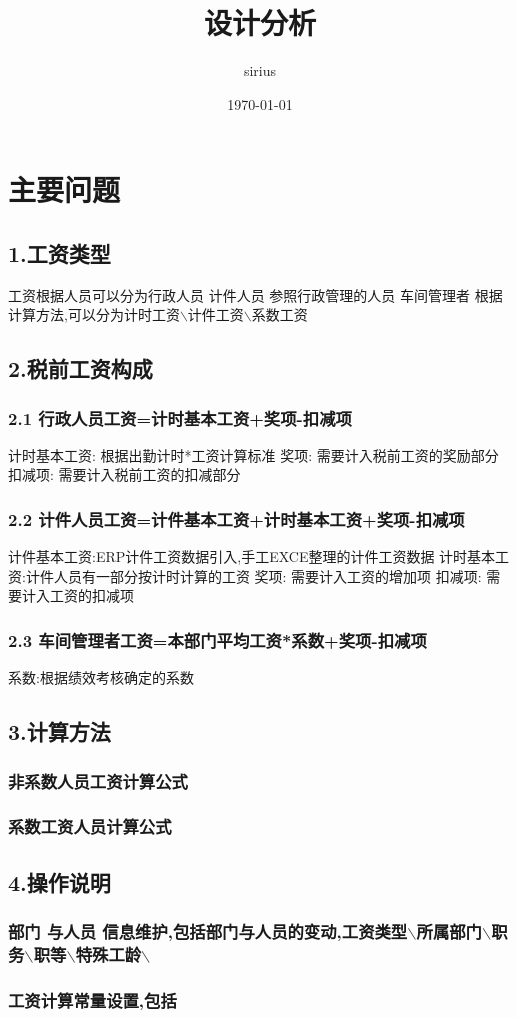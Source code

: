 \documentclass[11pt]{article}
\author{sirius}
\date{\today}
\title{设计分析}
\begin{document}
\maketitle
\tableofcontents

\section{}
\label{sec-1}
\section{主要问题}
\label{sec-2}
\subsection{1.工资类型}
\label{sec-2-1}
工资根据人员可以分为行政人员 计件人员 参照行政管理的人员 车间管理者
根据计算方法,可以分为计时工资$\backslash$计件工资$\backslash$系数工资
\subsection{2.税前工资构成}
\label{sec-2-2}
\subsubsection{2.1 行政人员工资=计时基本工资+奖项-扣减项}
\label{sec-2-2-1}
计时基本工资: 根据出勤计时*工资计算标准
奖项:   需要计入税前工资的奖励部分
扣减项: 需要计入税前工资的扣减部分
\subsubsection{2.2 计件人员工资=计件基本工资+计时基本工资+奖项-扣减项}
\label{sec-2-2-2}
计件基本工资:ERP计件工资数据引入,手工EXCE整理的计件工资数据
计时基本工资:计件人员有一部分按计时计算的工资
奖项:   需要计入工资的增加项
扣减项: 需要计入工资的扣减项

\subsubsection{2.3 车间管理者工资=本部门平均工资*系数+奖项-扣减项}
\label{sec-2-2-3}
系数:根据绩效考核确定的系数
\subsection{3.计算方法}
\label{sec-2-3}
\subsubsection{非系数人员工资计算公式}
\label{sec-2-3-1}
\subsubsection{系数工资人员计算公式}
\label{sec-2-3-2}
\subsection{4.操作说明}
\label{sec-2-4}
\subsubsection{部门 与人员 信息维护,包括部门与人员的变动,工资类型$\backslash$所属部门$\backslash$职务$\backslash$职等$\backslash$特殊工龄$\backslash$}
\label{sec-2-4-1}
\subsubsection{工资计算常量设置,包括}
\label{sec-2-4-2}
\end{document}
